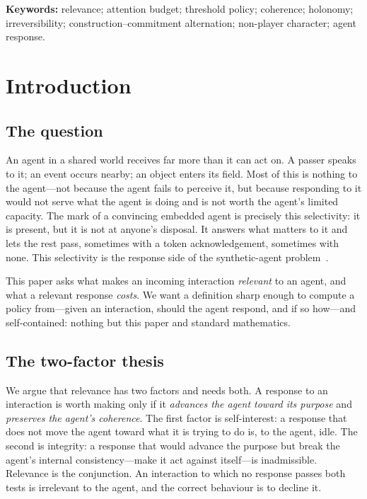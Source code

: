 \documentclass[11pt,twocolumn,a4paper]{article}
\begin{document}
\vspace{0.5em}
\noindent\textbf{Keywords:} relevance; attention budget; threshold policy;
coherence; holonomy; irreversibility; construction--commitment
alternation; non-player character; agent response.

\section{Introduction}
\label{sec:intro}

\subsection{The question}

An agent in a shared world receives far more than it can act on. A passer
speaks to it; an event occurs nearby; an object enters its field. Most of
this is nothing to the agent---not because the agent fails to perceive it,
but because responding to it would not serve what the agent is doing and
is not worth the agent's limited capacity. The mark of a convincing
embedded agent is precisely this selectivity: it is present, but it is not
at anyone's disposal. It answers what matters to it and lets the rest
pass, sometimes with a token acknowledgement, sometimes with none. This
selectivity is the response side of the synthetic-agent problem~\cite{%
russellnorvig2020,simon1996}.

This paper asks what makes an incoming interaction \emph{relevant} to an
agent, and what a relevant response \emph{costs}. We want a definition
sharp enough to compute a policy from---given an interaction, should the
agent respond, and if so how---and self-contained: nothing but this paper
and standard mathematics.

\subsection{The two-factor thesis}

We argue that relevance has two factors and needs both. A response to an
interaction is worth making only if it \emph{advances the agent toward its
purpose} and \emph{preserves the agent's coherence}. The first factor is
self-interest: a response that does not move the agent toward what it is
trying to do is, to the agent, idle. The second is integrity: a response
that would advance the purpose but break the agent's internal
consistency---make it act against itself---is inadmissible. Relevance is
the conjunction. An interaction to which no response passes both tests is
irrelevant to the agent, and the correct behaviour is to decline it.
\end{document}
